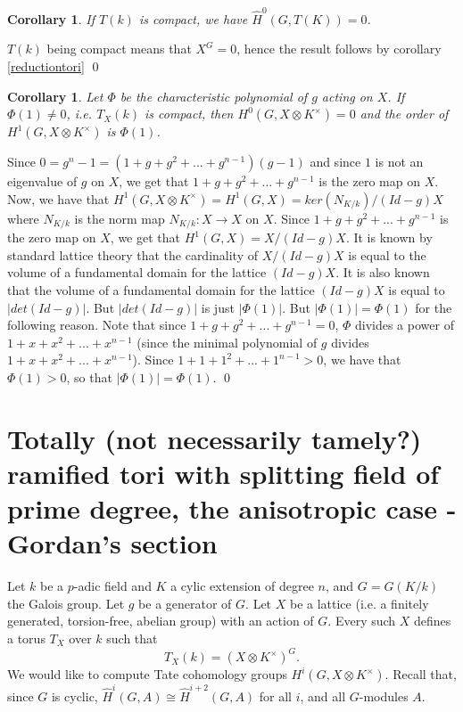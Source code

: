 \documentclass[11pt]{amsart}
\theoremstyle{plain}
\newtheorem{corollary}[enumi]{Corollary}
\begin{document}
\begin{corollary}
If $T(k)$ is compact, we have $\hat{H}^0(G, T(K)) = 0$.
\end{corollary}

\proof
$T(k)$ being compact means that $X^G = 0$, hence the result follows by corollary \ref{reductiontori}
\qed

\begin{corollary} Let $\Phi$ be the characteristic polynomial of $g$ acting on $X$. If $\Phi(1)\neq 0$,
i.e. $T_X(k)$ is compact,
then $H^0(G, X\otimes K^{\times})=0$ and the order of $H^1(G, X\otimes K^{\times})$ is $\Phi(1)$.
\end{corollary}

\proof
Since $0 = g^n - 1 = (1 + g + g^2 + ... + g^{n-1})(g-1)$ and since $1$ is not an eigenvalue of $g$ on $X$, we get that $1 + g + g^2 + ... + g^{n-1}$ is the zero map on $X$.  Now, we have that $H^1(G, X\otimes K^{\times}) = H^1(G, X) = ker(N_{K/k}) / (Id - g)X$ where $N_{K/k}$ is the norm map $N_{K/k} : X \rightarrow X$ on $X$. Since $1 + g + g^2 + ... + g^{n-1}$ is the zero map on $X$, we get that $H^1(G, X) = X / (Id - g)X$.
It is known by standard lattice theory that the cardinality of $X / (Id - g)X$ is equal to the volume of a fundamental domain for the lattice $(Id - g)X$.  It is also known that the volume of a fundamental domain for the lattice $(Id - g)X$ is equal to $|det(Id - g)|$.  But $|det(Id - g)|$ is just $|\Phi(1)|$.  But $|\Phi(1)| = \Phi(1)$ for the following reason.  Note that since $1 + g + g^2 + ... + g^{n-1} = 0$, $\Phi$ divides a power of $1 + x + x^2 + ... + x^{n-1}$ (since the minimal polynomial of $g$ divides $1 + x + x^2 + ... + x^{n-1}$).  Since $1 + 1 + 1^2 + ... + 1^{n-1} > 0$, we have that $\Phi(1) > 0$, so that $|\Phi(1)| = \Phi(1)$.
\qed

\section{Totally (not necessarily tamely?) ramified tori with splitting field of prime degree, the anisotropic case - Gordan's section}

Let $k$ be a $p$-adic field and $K$ a cylic extension of degree $n$, and $G=G(K/k)$ the
Galois group. Let $g$ be a generator of $G$.
 Let $X$ be a lattice (i.e. a finitely generated, torsion-free, abelian group) with
an action of $G$. Every such $X$ defines a torus  $T_X$ over $k$ such that
\[
T_X(k)=(X\otimes K^{\times})^G.
\]
We would like to compute Tate cohomology groups $H^i(G, X\otimes K^{\times})$. Recall that, since $G$ is
cyclic, $\hat{H}^{i}(G,A)\cong \hat{H}^{i+2}(G,A)$ for all $i$, and all $G$-modules $A$.
\end{document}
